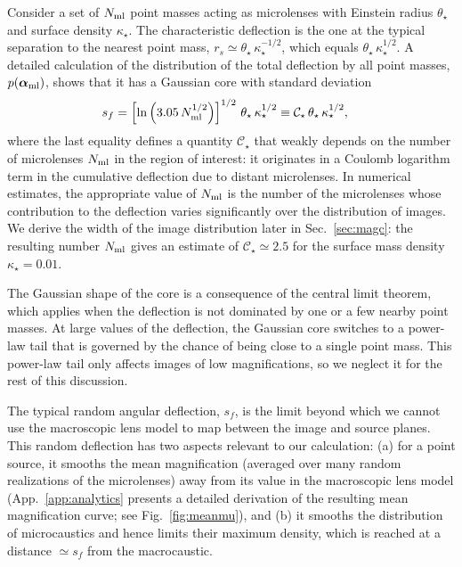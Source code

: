 \documentclass{aastex6}
\newcommand{\reffig}[1]{Fig.~\ref{fig:#1}}
\newcommand{\refsec}[1]{Sec.~\ref{sec:#1}}
\newcommand{\refapp}[1]{App.~\ref{app:#1}}
\begin{document}
Consider a set of $N_{\rm ml}$ point masses acting as microlenses with Einstein radius $\theta_\star$ and surface density $\kappa_\star$. The characteristic deflection is the one at the typical separation to the nearest point mass, $r_s\simeq \theta_\star\, \kappa_\star^{-1/2}$, which equals $\theta_\star\, \kappa_\star^{1/2}$. A detailed calculation of the distribution of the total deflection by all point masses, $p(\bm{\alpha}_{\rm ml})$, shows that it has a Gaussian core with standard deviation
\begin{align}
\label{eq:sf}
  s_f & = \left[ \ln{\left( 3.05\, N_{\rm ml}^{1/2} \right)} \right]^{1/2}\, \theta_\star\, \kappa_\star^{1/2}
 \equiv \mathcal{C}_{\star}\, \theta_\star\, \kappa_\star^{1/2},
\end{align}
where the last equality defines a quantity $\mathcal{C}_{\star}$ that weakly depends on the number of microlenses $N_{\rm ml}$ in the region of interest: it originates in a Coulomb logarithm term in the cumulative deflection due to distant microlenses. In numerical estimates, the appropriate value of $N_{\rm ml}$ is the number of the microlenses whose contribution to the deflection varies significantly over the distribution of images. We derive the width of the image distribution later in \refsec{magc}: the resulting number $N_{\rm ml}$ gives an estimate of $\mathcal{C}_\star \simeq 2.5$ for the surface mass density $\kappa_\star = 0.01$. 

The Gaussian shape of the core is a consequence of the central limit theorem, which applies when the deflection is not dominated by one or a few nearby point masses. At large values of the deflection, the Gaussian core switches to a power-law tail that is governed by the chance of being close to a single point mass. This power-law tail only affects images of low magnifications, so we neglect it for the rest of this discussion.

The typical random angular deflection, $s_f$, is the limit beyond which we cannot use the macroscopic lens model to map between the image and source planes. This random deflection has two aspects relevant to our calculation: (a) for a point source, it smooths the mean magnification (averaged over many random realizations of the microlenses) away from its value in the macroscopic lens model (\refapp{analytics} presents a detailed derivation of the resulting mean magnification curve; see \reffig{meanmu}), and (b) it smooths the distribution of microcaustics and hence limits their maximum density, which is reached at a distance $\simeq s_f$ from the macrocaustic.
\end{document}
